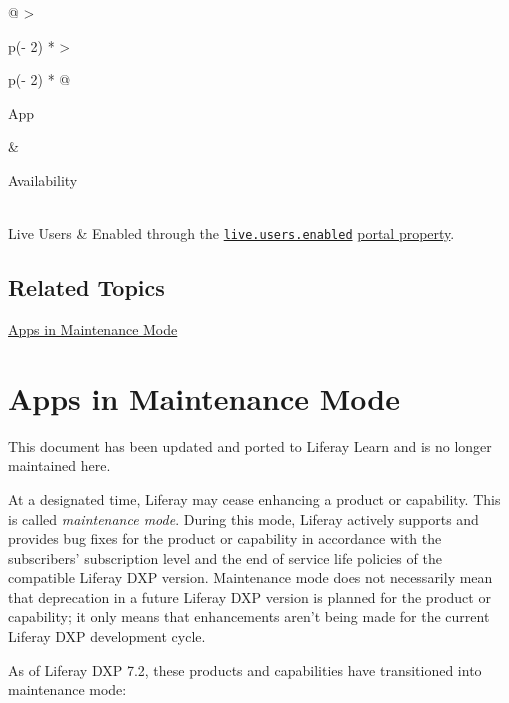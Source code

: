 \begin{longtable}[]{@{}
  >{\raggedright\arraybackslash}p{(\columnwidth - 2\tabcolsep) * }
  >{\raggedright\arraybackslash}p{(\columnwidth - 2\tabcolsep) * }@{}}
\toprule\noalign{}
\begin{minipage}[b]{\linewidth}\raggedright
App
\end{minipage} & \begin{minipage}[b]{\linewidth}\raggedright
Availability
\end{minipage} \\
\midrule\noalign{}
\endhead
\bottomrule\noalign{}
\endlastfoot
Live Users & Enabled through the
\href{https://docs.liferay.com/dxp/portal/7.2-latest/propertiesdoc/portal.properties.html}{\texttt{live.users.enabled}}
\href{/docs/7-2/deploy/-/knowledge_base/d/portal-properties}{portal
property}. \\
\end{longtable}

\noindent\hrulefill

\section{Related Topics}\label{related-topics-1}

\href{/docs/7-2/deploy/-/knowledge_base/d/apps-in-maintenance-mode}{Apps
in Maintenance Mode}

\chapter{Apps in Maintenance Mode}\label{apps-in-maintenance-mode}

{This document has been updated and ported to Liferay Learn and is no
longer maintained here.}

At a designated time, Liferay may cease enhancing a product or
capability. This is called \emph{maintenance mode}. During this mode,
Liferay actively supports and provides bug fixes for the product or
capability in accordance with the subscribers' subscription level and
the end of service life policies of the compatible Liferay DXP version.
Maintenance mode does not necessarily mean that deprecation in a future
Liferay DXP version is planned for the product or capability; it only
means that enhancements aren't being made for the current Liferay DXP
development cycle.

As of Liferay DXP 7.2, these products and capabilities have transitioned
into maintenance mode:

